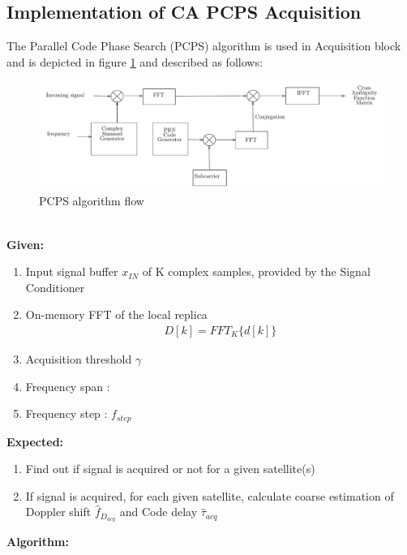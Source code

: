 \subsection{Implementation of CA PCPS Acquisition}
The Parallel Code Phase Search (PCPS) algorithm is used in Acquisition block and is depicted in figure \ref{fig:pcps_flow} and described as follows:
\begin{normalsize}
\begin{figure}[ht]
	\centering
	\includegraphics[width=1\columnwidth]{figs/pcps}
	\centering
	\captionsetup{justification=centering}
	\caption{PCPS algorithm flow}
	\label{fig:pcps_flow}
\end{figure}
\end{normalsize}
\\
\textbf{Given:}
\begin{enumerate}
	\item Input signal buffer $x_{IN}$ of K complex samples, provided by the Signal Conditioner 
	\item On-memory FFT of the local replica
	\begin{align}
		D[k]=FFT_K\{d[k]\}
	\end{align}
	\item Acquisition threshold  $\gamma$
	\item Frequency span : 
	\item Frequency step : $f_{step}$
\end{enumerate}
\textbf{Expected:}
\begin{enumerate}
	\item Find out if signal is acquired or not for a given satellite(s) 
	\item If signal is acquired, for each given satellite, calculate coarse estimation of Doppler shift $\hat f_{D_{acq}}$ and Code delay $\hat \tau_{acq}$
\end{enumerate}
\textbf{Algorithm:}
